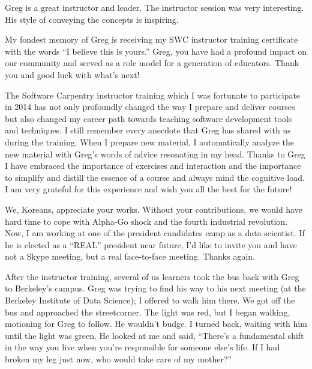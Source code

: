
\newpage

Greg is a great instructor and leader. The instructor session was very
interesting. His style of conveying the concepts is inspiring.


\newpage

My fondest memory of Greg is receiving my SWC instructor training certificate
with the words ``I believe this is yours.'' Greg, you have had a profound
impact on our community and served as a role model for a generation of
educators.  Thank you and good luck with what's next!


\newpage

The Software Carpentry instructor training which I was fortunate to participate
in 2014 has not only profoundly changed the way I prepare and deliver courses
but also changed my career path towards teaching software development tools and
techniques. I still remember every anecdote that Greg has shared with us during
the training. When I prepare new material, I automatically analyze the new
material with Greg's words of advice resonating in my head. Thanks to Greg I
have embraced the importance of exercises and interaction and the importance to
simplify and distill the essence of a course and always mind the cognitive
load. I am very grateful for this experience and wish you all the best for the
future!


\newpage

We, Koreans, appreciate your works. Without your contributions, we would have
hard time to cope with Alpha-Go shock and the fourth industrial revolution.
Now, I am working at one of the president candidates camp as a data scientist.
If he is elected as a ``REAL'' president near future, I'd like to invite you
and have not a Skype meeting, but a real face-to-face meeting. Thanks again. 


\newpage

After the instructor training, several of us learners took the bus back with
Greg to Berkeley's campus. Greg was trying to find his way to his next meeting
(at the Berkeley Institute of Data Science); I offered to walk him there. We
got off the bus and approached the streetcorner. The light was red, but I began
walking, motioning for Greg to follow. He wouldn't budge. I turned back,
waiting with him until the light was green. He looked at me and said, ``There's
a fundamental shift in the way you live when you're responsible for someone
else's life. If I had broken my leg just now, who would take care of my
mother?''

